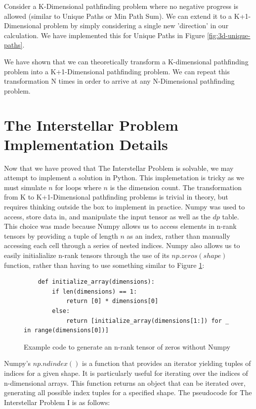 Consider a K-Dimensional pathfinding problem where no negative progress is allowed (similar to Unique Paths or Min Path Sum).
We can extend it to a K+1-Dimensional problem by simply considering a single new 'direction' in our calculation.
We have implemented this for Unique Paths in Figure \ref{fig:3d-unique-paths}.

We have shown that we can theoretically transform a K-dimensional pathfinding problem into a K+1-Dimensional pathfinding problem.
We can repeat this transformation N times in order to arrive at any N-Dimensional pathfinding problem.



\section{The Interstellar Problem Implementation Details}
Now that we have proved that The Interstellar Problem is solvable, we may attempt to implement a solution in Python.
This implemetation is tricky as we must simulate $n$ for loops where $n$ is the dimension count. The transformation from K to K+1-Dimensional pathfinding problems is trivial in theory, but requires thinking outside the box to implement in practice.
Numpy was used to 
access, store data in, and manipulate the input tensor as well as the $dp$ table.
This choice was made because Numpy allows us to access elements in n-rank tensors by providing a tuple of length $n$ as an index, rather than manually accessing each cell through a series of nested indices.
Numpy also allows us to easily initialialize n-rank tensors through the use of its $np.zeros(shape)$ function, rather than having to use something similar to Figure \ref{fig:zeros}:

\begin{figure}[H]
    \centering
    \begin{lstlisting}
    def initialize_array(dimensions):
        if len(dimensions) == 1:
            return [0] * dimensions[0]
        else:
            return [initialize_array(dimensions[1:]) for _ in range(dimensions[0])]
    \end{lstlisting}
    \caption{Example code to generate an n-rank tensor of zeros without Numpy}
    \label{fig:zeros}
\end{figure}

Numpy's $np.ndindex()$ is a function that provides an iterator yielding tuples of indices for a given shape.
It is particularly useful for iterating over the indices of n-dimensional arrays.
This function returns an object that can be iterated over, generating all possible index tuples for a specified shape.
\newpage
The pseudocode for The Interstellar Problem I is as follows:

